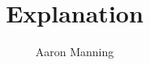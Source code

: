 \documentclass[a4paper]{article}
\title{Explanation}
\author{Aaron Manning}
\date{}
\begin{document}
\maketitle

    \maketitle

    \allowdisplaybreaks

    \raggedright

    \raggedbottom


    
\end{document}
